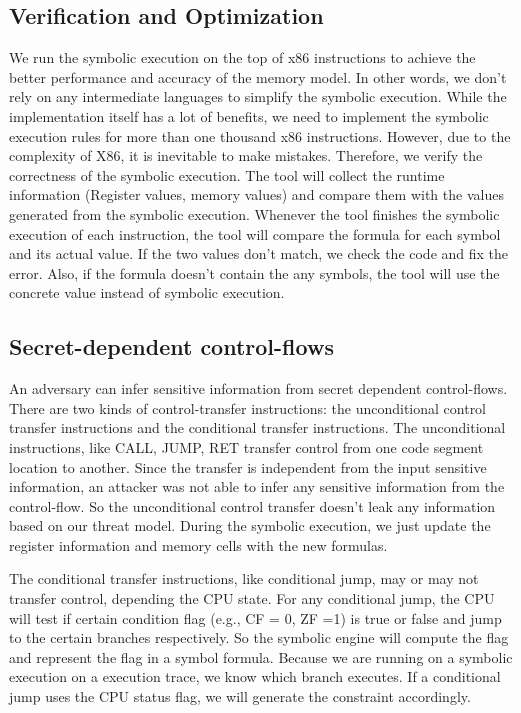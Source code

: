 \subsection{Verification and Optimization}
We run the symbolic execution on the top of x86 instructions to achieve the better performance and accuracy of the memory model. In other words, we don’t rely on any intermediate languages to simplify the symbolic execution. While the implementation itself has a lot of benefits, we need to implement the symbolic execution rules for more than one thousand x86 instructions. However, due to the complexity of X86, it is inevitable to make mistakes. Therefore, we verify the correctness of the symbolic execution. The tool will collect the runtime information (Register values, memory values) and compare them with the values generated from the symbolic execution. Whenever the tool finishes the symbolic execution of each instruction, the tool will compare the formula for each symbol and its actual value. If the two values don’t match, we check the code and fix the error. Also, if the formula doesn’t contain the any symbols, the tool will use the concrete value instead of symbolic execution.

\subsection{Secret-dependent control-flows}
An adversary can infer sensitive information from secret dependent control-flows. 
There are two kinds of control-transfer instructions: the unconditional control transfer instructions and the conditional transfer instructions. The unconditional instructions, like CALL, JUMP, RET transfer control from one code segment location to another. Since the transfer is independent from the input sensitive information, an attacker was not able to infer any sensitive information from the control-flow. So the unconditional control transfer doesn’t leak any information based on our threat model. During the symbolic execution, we just update the register information and memory cells with the new formulas.

The conditional transfer instructions, like conditional jump, may or may not transfer control, depending the CPU state. For any conditional jump, the CPU will test if certain condition flag (e.g., CF = 0, ZF =1) is true or false and jump to the certain branches respectively. So the symbolic engine will compute the flag and represent the flag in a symbol formula. Because we are running on a symbolic execution on a execution trace, we know which branch executes. If a conditional jump uses the CPU status flag, we will generate the constraint accordingly.


